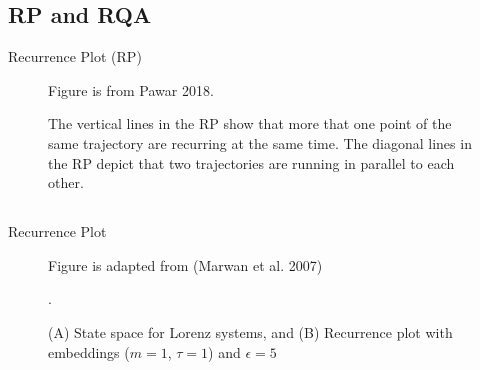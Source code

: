 \subsection{RP and RQA}
{

\begin{frame}{Recurrence Plot (RP)}

    \begin{figure}
	{Figure is from Pawar 2018.} 
	\caption{
	The vertical lines in the RP show that more that one point of 
	the same trajectory are recurring at the same time.
	The diagonal lines in the RP depict that two trajectories are running in parallel
	to each other.
}
   
\end{figure}
	


%


\end{frame}
}



\subsection{}
{

\begin{frame}{Recurrence Plot}
    \begin{figure}
		{Figure is adapted from (Marwan et al. 2007)}
	\caption{(A) State space for Lorenz systems, and 
		(B) Recurrence plot with embeddings ($m=1$, $\tau=1$) and $\epsilon=5$}. 
   \end{figure}

\end{frame}
}




